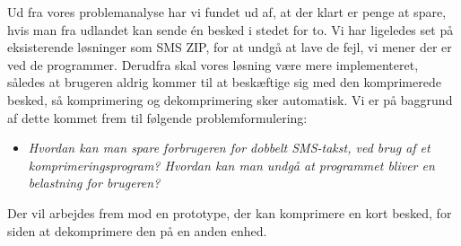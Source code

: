 Ud fra vores problemanalyse har vi fundet ud af, at der klart er penge at spare, hvis man fra udlandet kan sende én besked i stedet for to. Vi har ligeledes set på eksisterende løsninger som SMS ZIP, for at undgå at lave de fejl, vi mener der er ved de programmer. Derudfra skal vores løsning være mere implementeret, således at brugeren aldrig kommer til at beskæftige sig med den komprimerede besked, så komprimering og dekomprimering sker automatisk. Vi er på baggrund af dette kommet frem til følgende problemformulering:

\begin{itemize}
\item[] \emph{Hvordan kan man spare forbrugeren for dobbelt SMS-takst, ved brug af et komprimeringsprogram? Hvordan kan man undgå at programmet bliver en belastning for brugeren?}
\end{itemize}

Der vil arbejdes frem mod en prototype, der kan komprimere en kort besked, for siden at dekomprimere den på en anden enhed. 